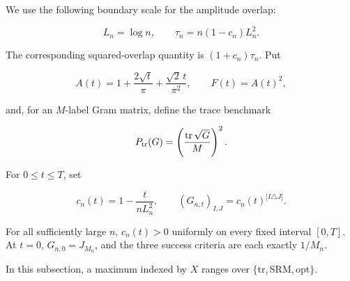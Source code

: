 We use the following boundary scale for the amplitude overlap:

\begin{equation}\label{eq:critical-parameter}
 L_n=\log n,
 \qquad
 \tau_n=n(1-c_n)L_n^2.
\end{equation}

The corresponding squared-overlap quantity is \((1+c_n)\tau_n\). Put

\begin{equation}\label{eq:critical-amplitude}
 A(t)=1+\frac{2\sqrt t}{\pi}+\frac{\sqrt2\,t}{\pi^2},
 \qquad F(t)=A(t)^2,
\end{equation}

and, for an \(M\)-label Gram matrix, define the trace benchmark

\begin{equation}\label{eq:critical-trace-benchmark}
 P_{\rm tr}(G)=\left(\frac{\operatorname{tr}\sqrt G}{M}\right)^2.
\end{equation}

For \(0\le t\le T\), set

\begin{equation}\label{eq:critical-overlap-family}
 c_n(t)=1-\frac{t}{nL_n^2},
 \qquad
 (G_{n,t})_{I,J}=c_n(t)^{|I\triangle J|}.
\end{equation}

For all sufficiently large \(n\), \(c_n(t)>0\) uniformly on every fixed
interval \([0,T]\). At \(t=0\), \(G_{n,0}=J_{M_n}\), and the three success
criteria are each exactly \(1/M_n\).

In this subsection, a maximum indexed by \(X\) ranges over
\(\{\mathrm{tr},\mathrm{SRM},\mathrm{opt}\}\).

